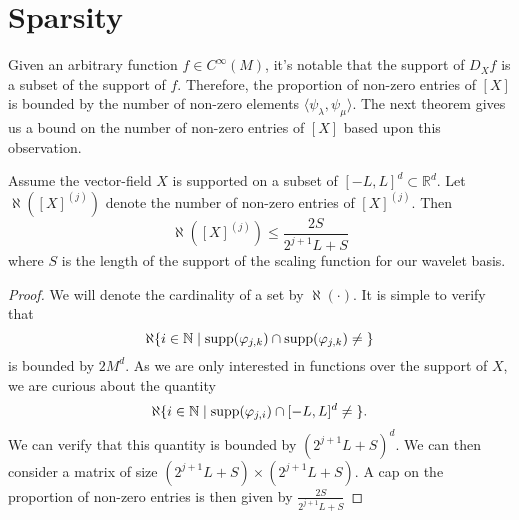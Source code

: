 \section{Sparsity}
  Given an arbitrary function $f \in C^{\infty}(M)$, it's notable that the support of $D_X f$ is a subset of the support of $f$.
  Therefore, the proportion of non-zero entries of $[X]$ is bounded by the number of non-zero elements $\langle \psi_\lambda , \psi_\mu \rangle$.
  The next theorem gives us a bound on the number of non-zero entries of $[X]$ based upon this observation.
  
  \begin{theorem}
  Assume the vector-field $X$ is supported on a subset of $[-L,L]^d \subset \mathbb{R}^d$.
  Let $\aleph( [X]^{(j)})$ denote the number of non-zero entries of $[X]^{(j)}$.  Then
  \[
  	\aleph( [X]^{(j)} ) \leq \frac{2 S }{2^{j+1}L + S}
  \]
  where $S$ is the length of the support of the scaling function for our wavelet basis.
  \end{theorem}
  \begin{proof}
  We will denote the cardinality of a set by $\aleph( \cdot )$.
  It is simple to verify that
  \[
  	\aleph \{ i \in \mathbb{N} \mid {\rm supp}( \phi_{j,k} ) \cap {\rm supp}( \phi_{j,k} ) \neq \null \}
  \]
  is bounded by $2M^d$.
  As we are only interested in functions over the support of $X$, we are curious about the quantity
  \[
  	\aleph \{ i \in \mathbb{N} \mid {\rm supp}( \phi_{j,i} ) \cap [-L,L]^d \neq \null \}.
  \]
  We can verify that this quantity is bounded by $(2^{j+1}L+S)^d$.
  We can then consider a matrix of size $(2^{j+1} L + S) \times (2^{j+1} L + S )$.
  A cap on the proportion of non-zero entries is then given by  $\frac{2 S }{2^{j+1}L + S}$
  
  \end{proof}
